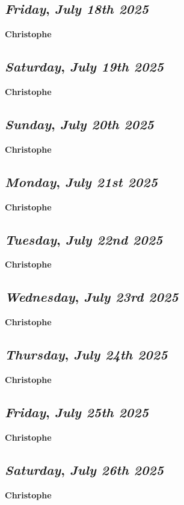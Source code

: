 \def\day{\textit{July 18th 2025}}
\def\weekday{\textit{Friday}}
\subsection*{\weekday, \day}
\textbf {Christophe}

\def\day{\textit{July 19th 2025}}
\def\weekday{\textit{Saturday}}
\subsection*{\weekday, \day}
\textbf {Christophe}

\def\day{\textit{July 20th 2025}}
\def\weekday{\textit{Sunday}}
\subsection*{\weekday, \day}
\textbf {Christophe}

\def\day{\textit{July 21st 2025}}
\def\weekday{\textit{Monday}}
\subsection*{\weekday, \day}
\textbf {Christophe}

\def\day{\textit{July 22nd 2025}}
\def\weekday{\textit{Tuesday}}
\subsection*{\weekday, \day}
\textbf {Christophe}

\def\day{\textit{July 23rd 2025}}
\def\weekday{\textit{Wednesday}}
\subsection*{\weekday, \day}
\textbf {Christophe}

\def\day{\textit{July 24th 2025}}
\def\weekday{\textit{Thursday}}
\subsection*{\weekday, \day}
\textbf {Christophe}

\def\day{\textit{July 25th 2025}}
\def\weekday{\textit{Friday}}
\subsection*{\weekday, \day}
\textbf {Christophe}

\def\day{\textit{July 26th 2025}}
\def\weekday{\textit{Saturday}}
\subsection*{\weekday, \day}
\textbf {Christophe}

